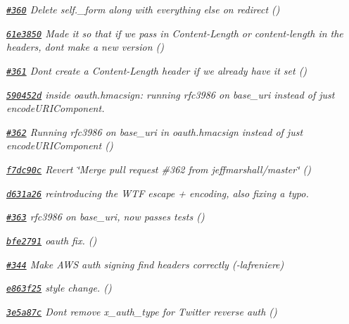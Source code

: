 \begin{DoxyItemize}
\item {\itshape \href{https://github.com/mikeal/request/pull/360}{\tt \#360} Delete self.\+\_\+form along with everything else on redirect ()}
\item {\itshape \href{https://github.com/mikeal/request/commit/61e3850f0f91ca6732fbd06b46796fbcd2fea1ad}{\tt 61e3850} Made it so that if we pass in Content-\/\+Length or content-\/length in the headers, don\textquotesingle{}t make a new version ()}
\item {\itshape \href{https://github.com/mikeal/request/pull/361}{\tt \#361} Don\textquotesingle{}t create a Content-\/\+Length header if we already have it set ()}
\item {\itshape \href{https://github.com/mikeal/request/commit/590452d6569e68e480d4f40b88022f1b81914ad6}{\tt 590452d} inside oauth.\+hmacsign\+: running rfc3986 on base\+\_\+uri instead of just encode\+U\+R\+I\+Component.}
\item {\itshape \href{https://github.com/mikeal/request/pull/362}{\tt \#362} Running {\ttfamily rfc3986} on {\ttfamily base\+\_\+uri} in {\ttfamily oauth.\+hmacsign} instead of just {\ttfamily encode\+U\+R\+I\+Component} ()}
\item {\itshape \href{https://github.com/mikeal/request/commit/f7dc90c8dae743d5736dc6c807eecde613eb4fd4}{\tt f7dc90c} Revert \char`\"{}\+Merge pull request \#362 from jeffmarshall/master\char`\"{} ()}
\item {\itshape \href{https://github.com/mikeal/request/commit/d631a26e263077eca3d4925de9b0a8d57365ba90}{\tt d631a26} reintroducing the W\+T\+F escape + encoding, also fixing a typo.}
\item {\itshape \href{https://github.com/mikeal/request/pull/363}{\tt \#363} rfc3986 on base\+\_\+uri, now passes tests ()}
\item {\itshape \href{https://github.com/mikeal/request/commit/bfe2791f596b749eed6961159d41a404c3aba0d0}{\tt bfe2791} oauth fix. ()}
\item {\itshape \href{https://github.com/mikeal/request/pull/344}{\tt \#344} Make A\+W\+S auth signing find headers correctly (-\/lafreniere)}
\item {\itshape \href{https://github.com/mikeal/request/commit/e863f25336abc7b9f9936c20e0c06da8db0c6593}{\tt e863f25} style change. ()}
\item {\itshape \href{https://github.com/mikeal/request/commit/3e5a87ce28b3bb45861b32f283cd20d0084d78a7}{\tt 3e5a87c} Don\textquotesingle{}t remove x\+\_\+auth\+\_\+type for Twitter reverse auth ()}

\end{DoxyItemize}
